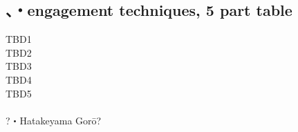 \documentclass[dvipdfmx, a4paper, 12pt]{utarticle}
\begin{document}
\begin{CJK*}{UTF8}{min}
\begin{landscape}
\section{、・engagement techniques, 5 part table}
\noindent TBD1\\
TBD2\\
TBD3\\
TBD4\\
TBD5\\
\\
?・Hatakeyama Gor\={o}?

\end{landscape}
\end{CJK*}
\end{document}
